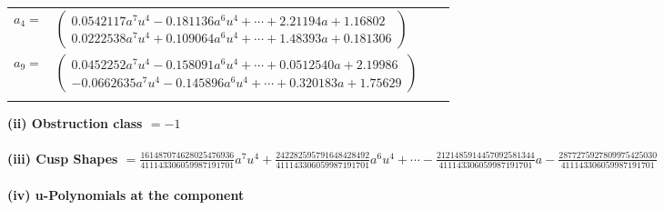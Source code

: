 \documentclass[1p]{elsarticle_modified}
\theoremstyle{definition}
\begin{document}
\begin{tabular}{m{7pt} m{180pt} m{7pt} m{180pt} }
\flushright $a_{4}=$&$\begin{pmatrix}0.0542117 a^{7} u^{4}-0.181136 a^{6} u^{4}+\cdots+2.21194 a+1.16802\\0.0222538 a^{7} u^{4}+0.109064 a^{6} u^{4}+\cdots+1.48393 a+0.181306\end{pmatrix}$ \\
\flushright $a_{9}=$&$\begin{pmatrix}0.0452252 a^{7} u^{4}-0.158091 a^{6} u^{4}+\cdots+0.0512540 a+2.19986\\-0.0662635 a^{7} u^{4}-0.145896 a^{6} u^{4}+\cdots+0.320183 a+1.75629\end{pmatrix}$\\&\end{tabular}
\flushleft \textbf{(ii) Obstruction class $= -1$}\\~\\
\flushleft \textbf{(iii) Cusp Shapes $= \frac{161487074628025476936}{411143306059987191701} a^7 u^4+\frac{242282595791648428492}{411143306059987191701} a^6 u^4+\cdots-\frac{2121485914457092581344}{411143306059987191701} a-\frac{2877275927809975425030}{411143306059987191701}$}\\~\\
\newpage\renewcommand{\arraystretch}{1}
\flushleft \textbf{(iv) u-Polynomials at the component}\newline \\
\end{document}
